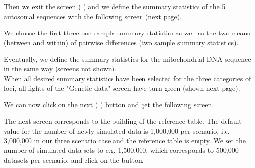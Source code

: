 Then we exit the screen ( ) and we define the summary statistics of the 5 autosomal sequences with the following screen (next page).

\newpage


We choose the first three one sample summary statistics as well as the two means (between and within) of pairwise differences (two sample summary statistics).


Eventually, we define the summary statistics for the mitochondrial DNA sequence in the same way (screens not shown).\\

When all desired summary statistics have been selected for the three categories of loci, all lights of the "Genetic data" screen have turn green (shown next page).

\newpage


We can now click on the next ( \fbox{\textsf{$>>$}}) button and get the following screen.




The next screen  corresponds to the building of the reference table. The default value for the number of newly simulated data is 1,000,000 per scenario, i.e. 3,000,000 in our three scenario case and the reference table is empty.
We set the number of simulated data sets to e.g. 1,500,000, which corresponds to 500,000 datasets per scenario,
and click on the  button.

